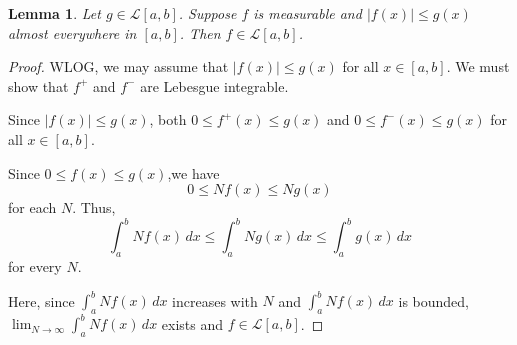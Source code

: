 \documentclass[12pt]{amsart}
\theoremstyle{plain}
\newtheorem{lemma}[thm]{Lemma}
\theoremstyle{definition}
\theoremstyle{remark}
\numberwithin{equation}{section}
\numberwithin{thm}{section}
\begin{document}

\begin{lemma}
\label{ForHoldersIneq}
Let $g \in \mathcal{L}[a, b]$. Suppose $f$ is measurable and $|f(x)| \leq g(x)$ almost everywhere in $[a, b]$. Then $f \in \mathcal{L}[a, b]$.
\end{lemma}
\begin{proof}
WLOG, we may assume that $|f(x)| \leq g(x)$ for all $x \in [a, b]$. We must show that $f^+$ and $f^-$ are Lebesgue integrable. 

Since $|f(x)| \leq g(x)$, both $0 \leq f^+(x) \leq g(x)$ and $0 \leq f^-(x) \leq g(x)$ for all $x \in [a, b]$. 

Since $0 \leq f(x) \leq g(x)$,we have \[ 0 \leq Nf(x) \leq Ng(x) \]
for each $N$. Thus, \[ \int_a^b Nf(x) \, dx \leq \int_a^b Ng(x) \, dx \leq \int_a^b g(x) \, dx \] for every $N$.

Here, since $\int_a^b Nf(x) \, dx$ increases with $N$ and $\int_a^b Nf(x) \, dx$ is bounded,
$\lim_{N\to\infty} \int_a^b Nf(x) \, dx$ exists and $f \in \mathcal{L}[a, b]$.
\end{proof}
\end{document}

